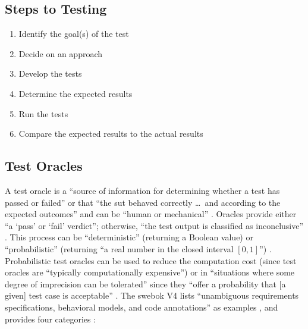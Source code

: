 \subsection[Steps to Testing]{Steps to Testing
    \citep[p.~443]{PetersAndPedrycz2000}}
\begin{enumerate}
    \item Identify the goal(s) of the test
    \item Decide on an approach
    \item Develop the tests
    \item Determine the expected results
    \item Run the tests
    \item Compare the expected results to the actual results
\end{enumerate}

\subsection{Test Oracles}
A test oracle is a ``source of information for determining whether a test has
passed or failed'' \citep[p.~13]{IEEE2022} or that ``the \acs{sut} behaved
correctly \dots\ and according to the expected outcomes'' and can be ``human or
mechanical'' \citep[p.~5-5]{SWEBOK2024}. Oracles provide either ``a
`pass' or `fail' verdict''; otherwise, ``the test output is classified as
inconclusive'' \citep[p.~5-5]{SWEBOK2024}. This process can be ``deterministic''
(returning a Boolean value) or ``probabilistic'' (returning ``a real number in
the closed interval $[0, 1]$'') \citep[p.~509]{BarrEtAl2015}. Probabilistic
test oracles can be used to reduce the computation cost (since test oracles
are ``typically computationally expensive'') \citep[p.~509]{BarrEtAl2015}
or in ``situations where some degree of imprecision can be tolerated'' since
they ``offer a probability that [a given] test case is acceptable''
\citep[p.~510]{BarrEtAl2015}. The \acs{swebok} V4 lists ``unambiguous requirements
specifications, behavioral models, and code annotations'' as examples
\citep[p.~5-5]{SWEBOK2024}, and \citeauthor{BarrEtAl2015} provides four
categories \citeyearpar[p.~510]{BarrEtAl2015}:

